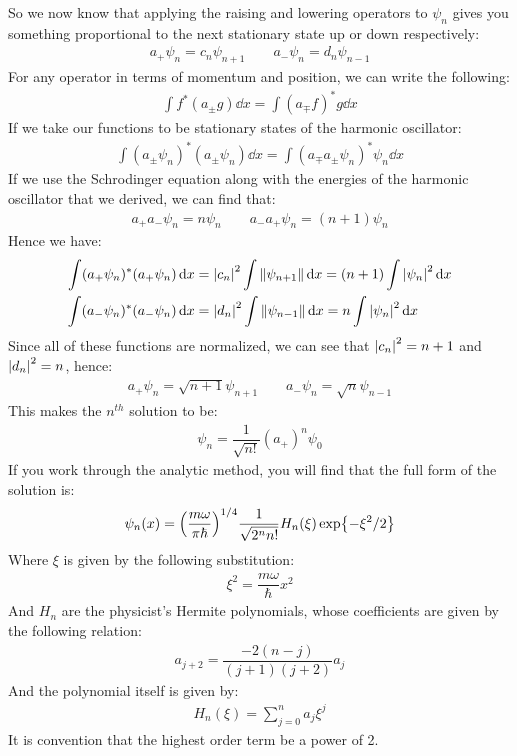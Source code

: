 So we now know that applying the raising and lowering operators to $\psi_n$ gives you something proportional to the next stationary state up or down respectively:
\begin{align*}
  a_+\psi_n=c_n\psi_{n+1} \qquad a_-\psi_n=d_n\psi_{n-1}
\end{align*}
For any operator in terms of momentum and position, we can write the following:
\begin{align*}
  \int f^*(a_\pm g)\dd{x}=\int(a_\mp f)^*g\dd{x}
\end{align*}
If we take our functions to be stationary states of the harmonic oscillator:
\begin{align*}
  \int(a_\pm\psi_n)^*(a_\pm\psi_n)\dd{x}=\int(a_\mp a_\pm\psi_n)^*\psi_n\dd{x}
\end{align*}
If we use the Schrodinger equation along with the energies of the harmonic oscillator that we derived, we can find that:
\begin{align*}
  a_+a_-\psi_n=n\psi_n \qquad a_-a_+\psi_n=(n+1)\psi_n
\end{align*}
Hence we have:
\begin{align*}
  \int(a_+\psi_n)^*(a_+\psi_n)\dd{x}&=\abs{c_n}^2\int\norm{\psi_{n+1}}\dd{x}
  =(n+1)\int\abs{\psi_n}^2\dd{x} \\
  \int(a_-\psi_n)^*(a_-\psi_n)\dd{x}&=\abs{d_n}^2\int\norm{\psi_{n-1}}\dd{x}
  =n\int\abs{\psi_n}^2\dd{x}
\end{align*}
Since all of these functions are normalized, we can see that $\abs{c_n}^2=n+1$ and $\abs{d_n}^2=n$, hence:
\begin{align*}
  a_+\psi_n=\sqrt{n+1}\psi_{n+1} \qquad a_-\psi_n=\sqrt{n}\psi_{n-1}
\end{align*}
This makes the $n^{th}$ solution to be:
\begin{align*}
  \psi_n=\dfrac{1}{\sqrt{n!}}(a_+)^n\psi_0
\end{align*}
If you work through the analytic method, you will find that the full form of the solution is:
\begin{align*}
  \psi_n(x)=
  \qty(\dfrac{m\omega}{\pi\hbar})^{1/4}\dfrac{1}{\sqrt{2^nn!}}H_n(\xi)\exp{-\xi^2/2}
\end{align*}
Where $\xi$ is given by the following substitution:
\begin{align*}
  \xi^2=\dfrac{m\omega}{\hbar}x^2
\end{align*}
And $H_n$ are the physicist's Hermite polynomials, whose coefficients are given by the following relation:
\begin{align*}
  a_{j+2}=\dfrac{-2(n-j)}{(j+1)(j+2)}a_j
\end{align*}
And the polynomial itself is given by:
\begin{align*}
  H_n(\xi)=\sum_{j=0}^na_j\xi^j
\end{align*}
It is convention that the highest order term be a power of 2.
